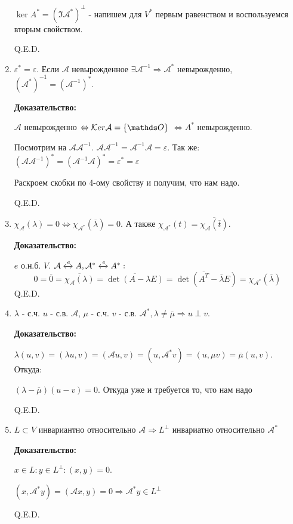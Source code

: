 \begin{enumerate}
$\ker A^* = (\Im \mathcal{A}^*)^\perp$ - напишем для $V^*$ первым равенством  и воспользуемся вторым свойством.

\hfill Q.E.D.

\item $\varepsilon^* = \varepsilon$. Если $\mathcal{A}$ невырожденное $\exists \mathcal{A}^{-1} \Rightarrow \mathcal{A}^*$ невырожденно, $(\mathcal{A}^*)^{-1} = (\mathcal{A}^{-1})^*$.

\textbf{Доказательство:}

$\mathcal{A}$ невырожденно $\Leftrightarrow \ker \mathcal{A} = \{\zero\}$ $\Leftrightarrow A^*$ невырожденно.

Посмотрим на $\mathcal{A}\mathcal{A^{-1}}$. $\mathcal{A}\mathcal{A}^{-1}= \mathcal{A}^{-1}\mathcal{A} = \varepsilon$. Так же:
$(\mathcal{A}\mathcal{A}^{-1})^*= (\mathcal{A}^{-1}\mathcal{A})^* = \varepsilon^* = \varepsilon$

Раскроем скобки по 4-ому свойству и получим, что нам надо.

\hfill Q.E.D.

\item $\chi_\mathcal{A}(\lambda) = 0  \Leftrightarrow \chi_{\mathcal{A}^*}(\overline{\lambda})=0$. А также $\chi_{\mathcal{A}^*}(t)=\overline{\chi_\mathcal{A}(\overline{t})}$.

\textbf{Доказательство:}

$e$ о.н.б. $V$. $\mathcal{A} \xleftrightarrow{e}A, \mathcal{A}^* \xleftrightarrow{e}A^*:$
$$0 = \overline{ 0} = \overline{\chi_\mathcal{A}(\lambda)}= \overline{\det (A - \lambda E)} = \det (\overline{A^T} - \overline{\lambda} E) = \chi_{\mathcal{A}^*} (\overline{\lambda})$$
\hfill Q.E.D.

\item $\lambda$ - с.ч. $u$ - с.в. $\mathcal{A}$, $\mu$ - с.ч. $v$ - с.в. $\mathcal{A^*}, \lambda \neq \overline{\mu} \Rightarrow u \perp v$.

\textbf{Доказательство:}

$\lambda(u,v)=(\lambda u,v)=(\mathcal{A}u, v ) = (u,\mathcal{A}^* v) = (u, \mu v) = \overline{\mu}(u,v)$. Откуда:

$(\lambda - \overline{\mu})(u-v) = 0$. Откуда уже и требуется то, что нам надо

\hfill Q.E.D.

\item $L \subset V$ инвариантно относительно $\mathcal{A} \Rightarrow L^\perp$ инвариатно относительно $\mathcal{A}^*$  

\textbf{Доказательство:}

$x\in L: y\in L^\perp: (x,y) =0$.

$(x,\mathcal{A}^*y) = (\mathcal{A}x, y ) = 0 \Rightarrow \mathcal{A}^*y \in L^\perp$

\hfill Q.E.D.
\end{enumerate}

